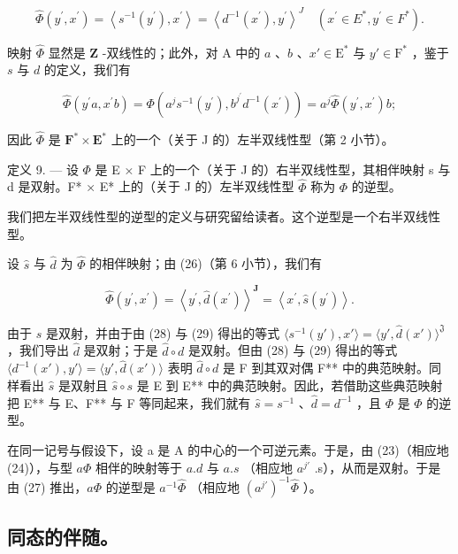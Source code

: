 \[
\hat {\Phi} (y ^ {\prime}, x ^ {\prime}) = \left\langle s ^ {- 1} (y ^ {\prime}), x ^ {\prime} \right\rangle = \left\langle d ^ {- 1} (x ^ {\prime}), y ^ {\prime} \right\rangle^ {J} \quad (x ^ {\prime} \in E ^ {*}, y ^ {\prime} \in F ^ {*}).\tag{28}
\]

映射 \(\hat{\Phi}\) 显然是 \(\mathbf{Z}\) -双线性的；此外，对 A 中的 \(a\) 、\(b\) 、\(x' \in \mathrm{E}^*\) 与 \(y' \in \mathrm{F}^*\) ，鉴于 \(s\) 与 \(d\) 的定义，我们有

\[
\widehat {\Phi} (y ^ {\prime} a, x ^ {\prime} b) = \Phi (a ^ {j} s ^ {- 1} (y ^ {\prime}), b ^ {j ^ {\prime}} d ^ {- 1} (x ^ {\prime})) = a ^ {j} \widehat {\Phi} (y ^ {\prime}, x ^ {\prime}) b;
\]

因此 \(\hat{\Phi}\) 是 \(\mathbf{F}^{*} \times \mathbf{E}^{*}\) 上的一个（关于 J 的）左半双线性型（第 2 小节）。

定义 9. --- 设 \(\Phi\) 是 E × F 上的一个（关于 J 的）右半双线性型，其相伴映射 s 与 d 是双射。F* × E* 上的（关于 J 的）左半双线性型 \(\hat{\Phi}\) 称为 \(\Phi\) 的逆型。

我们把左半双线性型的逆型的定义与研究留给读者。这个逆型是一个右半双线性型。

设 \(\hat{s}\) 与 \(\hat{d}\) 为 \(\hat{\Phi}\) 的相伴映射；由 (26)（第 6 小节），我们有

\[
\hat {\Phi} (y ^ {\prime}, x ^ {\prime}) = \left\langle y ^ {\prime}, \hat {d} (x ^ {\prime}) \right\rangle^ {\mathbf {J}} = \left\langle x ^ {\prime}, \hat {s} (y ^ {\prime}) \right\rangle .\tag{29}
\]

由于 \(s\) 是双射，并由于由 (28) 与 (29) 得出的等式 \(\langle s^{-1}(y'), x'\rangle = \langle y', \hat{d}(x') \rangle^{\mathfrak{J}}\) ，我们导出 \(\hat{d}\) 是双射；于是 \(\hat{d} \circ d\) 是双射。但由 (28) 与 (29) 得出的等式 \(\langle d^{-1}(x'), y' \rangle = \langle y', \hat{d}(x') \rangle\) 表明 \(\hat{d} \circ d\) 是 F 到其双对偶 F** 中的典范映射。同样看出 \(\hat{s}\) 是双射且 \(\hat{s} \circ s\) 是 E 到 E** 中的典范映射。因此，若借助这些典范映射把 E** 与 E、F** 与 F 等同起来，我们就有 \(\hat{s} = s^{-1}\) 、\(\hat{d} = d^{-1}\) ，且 \(\Phi\) 是 \(\hat{\Phi}\) 的逆型。

在同一记号与假设下，设 a 是 A 的中心的一个可逆元素。于是，由 (23)（相应地 (24)），与型 \(a\Phi\) 相伴的映射等于 \(a.d\) 与 \(a.s\) （相应地 \(a^{j'}\) .s），从而是双射。于是由 (27) 推出，\(a\Phi\) 的逆型是 \(a^{-1}\widehat{\Phi}\) （相应地 \((a^{j'})^{-1}\widehat{\Phi}\) ）。

\subsection{同态的伴随。}

